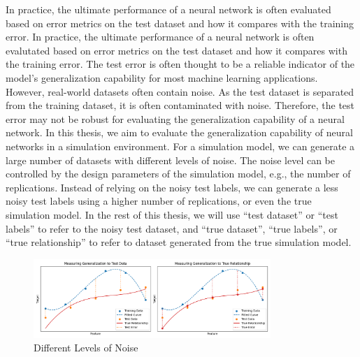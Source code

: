 In practice, the ultimate performance of a neural network is often evaluated based on error metrics on the test dataset and how it compares with the training error. 
In practice, the ultimate performance of a neural network is often evalutated based on error metrics on the test dataset and how it compares with the training error. 
The test error is often thought to be a reliable indicator of the model's generalization capability for most machine learning applications.
However, real-world datasets often contain noise.
As the test dataset is separated from the training dataset, it is often contaminated with noise.
Therefore, the test error may not be robust for evaluating the generalization capability of a neural network.
In this thesis, we aim to evaluate the generalization capability of neural networks in a simulation environment.
For a simulation model, we can generate a large number of datasets with different levels of noise.
The noise level can be controlled by the design parameters of the simulation model, e.g., the number of replications.
Instead of relying on the noisy test labels, we can generate a less noisy test labels using a higher number of replications, or even the true simulation model.
In the rest of this thesis, we will use ``test dataset'' or ``test labels'' to refer to the noisy test dataset, and ``true dataset'', ``true labels'', or ``true relationship'' to refer to dataset generated from the true simulation model.

\begin{figure}[ht!] 
    \centering
    \includegraphics[width=0.8\textwidth]{./project2/figures/datasets.png}
    \caption{Different Levels of Noise}
    \label{fig:datasets}
\end{figure}

